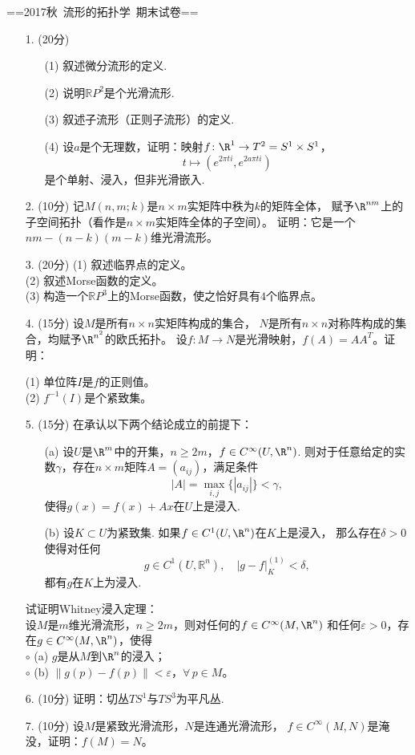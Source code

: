 ==2017秋\ 流形的拓扑学\ 期末试卷==
\begin{enumerate}
\item[1.] (20分) \begin{itemize}
    \item[(1)] 叙述微分流形的定义.
    \item[(2)] 说明$\mathbb{R}P^2$是个光滑流形.
    \item[(3)] 叙述子流形（正则子流形）的定义.
    \item[(4)]设$a$是个无理数，证明：映射$f\colon\R^1\to T^2=S^1\times S^1$，
$$t\mapsto(e^{2\pi ti},e^{2a\pi ti})$$
是个单射、浸入，但非光滑嵌入.
\end{itemize}

\item[2.] (10分) 记$M(n,m;k)$是$n\times m$实矩阵中秩为$k$的矩阵全体，
赋予$\R^{nm}$上的子空间拓扑（看作是$n\times m$实矩阵全体的子空间）。
证明：它是一个$nm-(n-k)(m-k)$维光滑流形。
\item[3.] (20分) (1) 叙述临界点的定义。\\
(2) 叙述Morse函数的定义。\\
(3) 构造一个$\mathbb{R}P^3$上的Morse函数，使之恰好具有$4$个临界点。
\item[4.] (15分) 设$M$是所有$n\times n$实矩阵构成的集合，
$N$是所有$n\times n$对称阵构成的集合，均赋予$\R^{n^2}$的欧氏拓扑。
设$f\colon M\to N$是光滑映射，$f(A)=AA^T$。证明：

(1) 单位阵$I$是$f$的正则值。\\
(2) $f^{-1}(I)$是个紧致集。
\item[5.] (15分) 
在承认以下两个结论成立的前提下：
\begin{itemize}
	\item [(a)] 设$U$是$\R^m$中的开集，$n\geq 2m$，$f\in C^\infty(U,\R^n)$. 
    则对于任意给定的实数$\gamma$，存在$n\times m$矩阵$A=(a_{ij})$，满足条件
	$$|A|=\max_{i,j}\{|a_{ij}|\}<\gamma,$$使得$g(x)=f(x)+Ax$在$U$上是浸入.
	\item [(b)] 设$K\subset U$为紧致集. 如果$f\in C^1(U,\R^n)$在$K$上是浸入，
    那么存在$\delta>0$使得对任何
	$$g\in C^1(U,\mathbb{R}^n), \quad |g-f|_K^{(1)}<\delta,$$
    都有$g$在$K$上为浸入.
\end{itemize}
试证明Whitney浸入定理：\\
设$M$是$m$维光滑流形，$n\ge2m$，则对任何的$f\in C^\infty(M,\R^n)$
和任何$\varepsilon>0$，存在$g\in C^\infty(M,\R^n)$，使得\\
$\circ$ (a) $g$是从$M$到$\R^n$的浸入；\\
$\circ$ (b) $\|g(p)-f(p)\|<\varepsilon$，$\forall\,p\in M$。

\item[6.] (10分) 
证明：切丛$TS^1$与$TS^3$为平凡丛.

\item[7.] (10分) 
设$M$是紧致光滑流形，$N$是连通光滑流形，
$f\in C^\infty(M,N)$是淹没，证明：$f(M)=N$。
\end{enumerate}